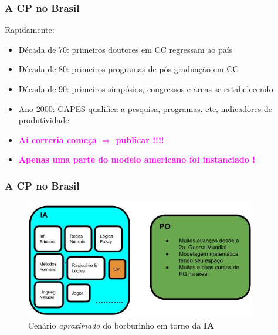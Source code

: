 \documentclass{beamer}
\begin{document}
\begin{frame}[fragile]
\frametitle{A CP no Brasil}
Rapidamente:
\begin{itemize}
    \item Década de 70: primeiros doutores em CC regressam ao país
    \item Década de 80: primeiros programas de pós-graduação em CC 
    \item Década de 90: primeiros simpósios, congressos e áreas se estabelecendo
    \item Ano 2000: CAPES qualifica a pesquisa, programas, etc, indicadores de produtividade
    
    \pause
    \item {\bf \textcolor{magenta}{Aí correria começa  $\Rightarrow$ publicar !!!!}}
    \item {\bf \textcolor{magenta}{Apenas uma parte do modelo americano foi instanciado !}}
\end{itemize}

\end{frame}


\begin{frame}[fragile]
\frametitle{A CP no Brasil}

\begin{figure}[!ht]
\begin{center}
\includegraphics[width=0.90\textwidth, height=0.65\textheight]{figures/ia_brasil_90.jpg}
\caption{Cenário {\em aproximado} do borburinho em torno da {\bf IA}}
\end{center}
\end{figure}

\end{frame}
\end{document}
